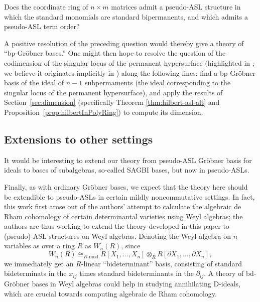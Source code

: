 \documentclass[11pt,reqno]{amsart}
\newcommand{\gb}{Gr\"{o}bner }
\theoremstyle{definition}
\numberwithin{equation}{section}
\begin{document}
\begin{open}
Does the coordinate ring of $n \times m$ matrices admit a pseudo-ASL structure in which the standard monomials are standard bipermanents, and which admits a pseudo-ASL term order?
\end{open}

A positive resolution of the preceding question would thereby give a theory of ``bp-\gb bases.'' One might then hope to resolve the question of the codimension of the singular locus of the permanent hypersurface (highlighted in \cite[Open Question 6.3.3.7]{landsberggct}; we believe it originates implicitly in \cite{vzg87}) along the following lines: find a bp-\gb basis of the ideal of $n-1$ subpermaments (the ideal corresponding to the singular locus of the permanent hypersurface), and apply the results of Section~\ref{sec:dimension} (specifically Theorem \ref{thm:hilbert-asl-alt} and Proposition~\ref{prop:hilbertInPolyRing}) to compute its dimension.


\subsection{Extensions to other settings}
\label{sec:conclusion-weyl}

It would be interesting to extend our theory from pseudo-ASL Gröbner basis for ideals to bases of subalgebras, so-called SAGBI bases, but now in pseudo-ASLs.

Finally, as with ordinary Gröbner bases, we expect that the theory here should be extendible to pseudo-ASLs in certain mildly noncommutative settings. In fact, this work first arose out of the authors' attempt to calculate the algebraic de Rham cohomology of certain determinantal varieties using Weyl algebras; the authors are thus working to extend the theory developed in this paper to (pseudo)-ASL structures on Weyl algebras. Denoting the Weyl algebra on $n$ variables as over a ring $R$ as $W_n(R)$, since 
\[
W_n(R) \cong_{R\text{-mod}} R[X_1, \ldots, X_n] \otimes_{R} R[\partial X_1, \ldots, \partial X_n],
\]
we immediately get an $R$-linear ``bideterminant'' basis, consisting of standard bideterminats in the $x_{ij}$ times standard bideterminants in the $\partial_{ij}$. A theory of bd-\gb bases in Weyl algebras could help in studying annihilating D-ideals, which are crucial towards computing algebraic de Rham cohomology.


 
 

\appendix
\end{document}
